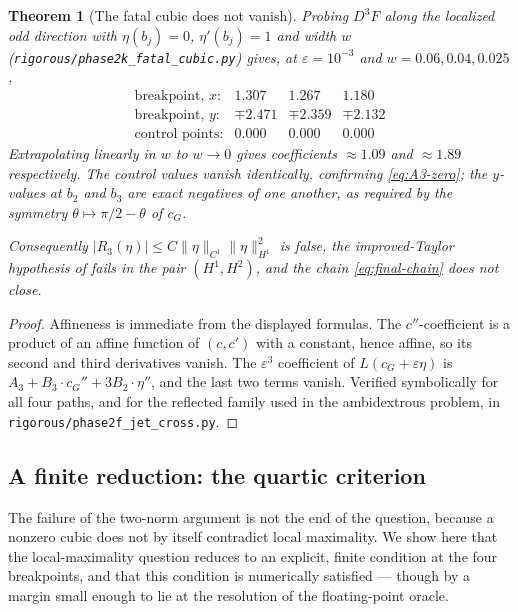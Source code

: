 \documentclass[11pt]{amsart}
\theoremstyle{plain}
\newtheorem{theorem}{Theorem}
\theoremstyle{definition}
\newcommand{\cG}{c_{G}}
\begin{document}
\begin{theorem}[The fatal cubic does not vanish]\label{thm:fatal-cubic}
Probing $D^{3}F$ along the localized odd direction with
$\eta(b_{j})=0$, $\eta'(b_{j})=1$ and width $w$
(\texttt{rigorous/phase2k\_fatal\_cubic.py}) gives, at
$\varepsilon=10^{-3}$ and $w = 0.06, 0.04, 0.025$,
\[
  \begin{array}{lccc}
    \text{breakpoint, } x: & 1.307 & 1.267 & 1.180\\
    \text{breakpoint, } y: & \mp2.471 & \mp2.359 & \mp2.132\\
    \text{control points:} & 0.000 & 0.000 & 0.000
  \end{array}
\]
Extrapolating linearly in $w$ to $w\to0$ gives coefficients
$\approx 1.09$ and $\approx 1.89$ respectively.  The control values
vanish identically, confirming \eqref{eq:A3-zero}; the $y$-values at
$b_{2}$ and $b_{3}$ are exact negatives of one another, as required by
the symmetry $\theta\mapsto\pi/2-\theta$ of $\cG$.

Consequently $|R_{3}(\eta)| \leq C\|\eta\|_{C^{1}}\|\eta\|^{2}_{H^{1}}$
is \emph{false}, the improved-Taylor hypothesis of
\cite{Ioffe1979,DambrineLamboley} fails in the pair
$(H^{1},H^{2})$, and the chain \eqref{eq:final-chain} does not close.
\end{theorem}

\begin{proof}
Affineness is immediate from the displayed formulas.  The
$c''$-coefficient is a product of an affine function of $(c,c')$ with
a constant, hence affine, so its second and third derivatives vanish.
The $\varepsilon^{3}$ coefficient of $L(\cG+\varepsilon\eta)$ is
$A_{3} + B_{3}\cdot\cG'' + 3B_{2}\cdot\eta''$, and the last two terms
vanish.  Verified symbolically for all four paths, and for the
reflected family used in the ambidextrous problem, in
\texttt{rigorous/phase2f\_jet\_cross.py}.
\end{proof}

\subsection{A finite reduction: the quartic criterion}
\label{sec:quartic}

The failure of the two-norm argument is not the end of the question,
because a nonzero cubic does not by itself contradict local maximality.
We show here that the local-maximality question reduces to an explicit,
finite condition at the four breakpoints, and that this condition is
numerically satisfied --- though by a margin small enough to lie at the
resolution of the floating-point oracle.
\end{document}

